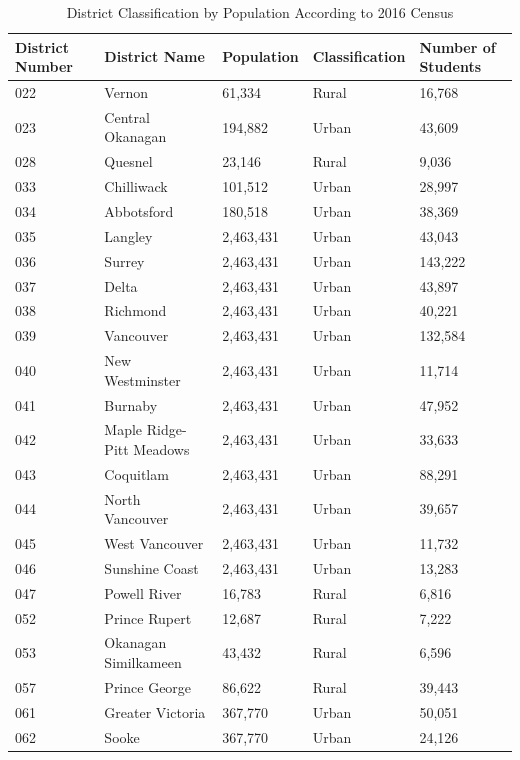 \documentclass[
  english,
  man]{apa6}
\begin{document}
\begin{table}[tbp]

\begin{center}
\begin{threeparttable}

\caption{\label{tab:District Census Population Table}District Classification by Population According to 2016 Census}

\begin{tabular}{lllll}
\toprule
District Number & District Name & Population & Classification & Number of Students\\
\midrule
022 & Vernon & 61,334 & Rural & 16,768\\
023 & Central Okanagan & 194,882 & Urban & 43,609\\
028 & Quesnel & 23,146 & Rural & 9,036\\
033 & Chilliwack & 101,512 & Urban & 28,997\\
034 & Abbotsford & 180,518 & Urban & 38,369\\
035 & Langley & 2,463,431 & Urban & 43,043\\
036 & Surrey & 2,463,431 & Urban & 143,222\\
037 & Delta & 2,463,431 & Urban & 43,897\\
038 & Richmond & 2,463,431 & Urban & 40,221\\
039 & Vancouver & 2,463,431 & Urban & 132,584\\
040 & New Westminster & 2,463,431 & Urban & 11,714\\
041 & Burnaby & 2,463,431 & Urban & 47,952\\
042 & Maple Ridge-Pitt Meadows & 2,463,431 & Urban & 33,633\\
043 & Coquitlam & 2,463,431 & Urban & 88,291\\
044 & North Vancouver & 2,463,431 & Urban & 39,657\\
045 & West Vancouver & 2,463,431 & Urban & 11,732\\
046 & Sunshine Coast & 2,463,431 & Urban & 13,283\\
047 & Powell River & 16,783 & Rural & 6,816\\
052 & Prince Rupert & 12,687 & Rural & 7,222\\
053 & Okanagan Similkameen & 43,432 & Rural & 6,596\\
057 & Prince George & 86,622 & Rural & 39,443\\
061 & Greater Victoria & 367,770 & Urban & 50,051\\
062 & Sooke & 367,770 & Urban & 24,126\\

\end{tabular}
\end{threeparttable}
\end{center}
\end{table}
\end{document}
